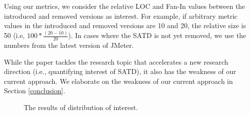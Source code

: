 
Using our metrics, we consider the relative LOC and Fan-In  values between the introduced and removed versions as interest. For example, if arbitrary metric values in the introduced and removed versions are 10 and 20, the relative size is 50 (i.e, $100* \frac{(20-10)}{20}$). In cases where the SATD is not yet removed, we use the numbers from the latest version of JMeter.

While the paper tackles the research topic that accelerates a new research direction (i.e., quantifying interest of SATD), it also has the weakness of our current approach. We elaborate on the weakness of our current approach in Section \ref{conclusion}.


\begin{figure}[!t]
  \begin{center}

  \caption{The results of distribution of interest.}
  \label{fig:dist}
  \end{center}
\end{figure}
